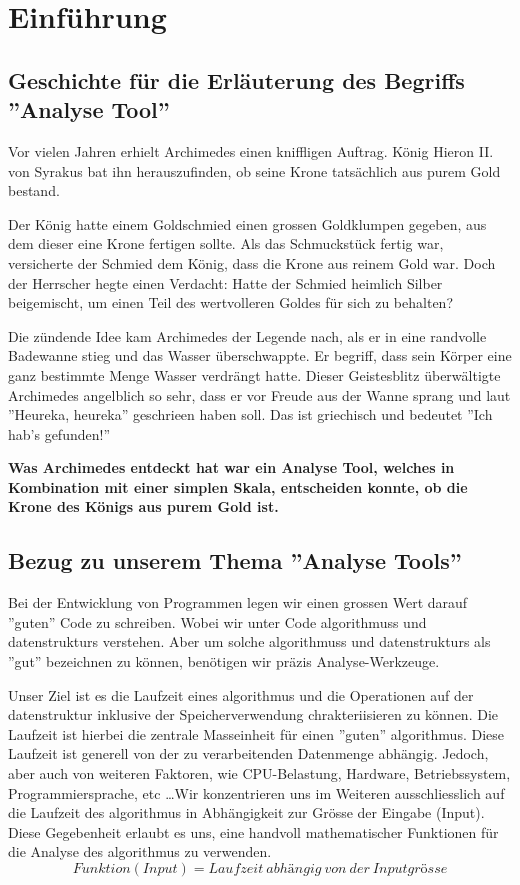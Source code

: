 \newpage
\section{Einführung}

\subsection*{Geschichte für die Erläuterung des Begriffs ''Analyse Tool''}
Vor vielen Jahren erhielt Archimedes einen kniffligen Auftrag. König Hieron II. von Syrakus bat ihn herauszufinden, ob seine Krone tatsächlich aus purem Gold bestand.

\par \medskip

Der König hatte einem Goldschmied einen grossen Goldklumpen gegeben, aus dem dieser eine Krone fertigen sollte. Als das Schmuckstück fertig war, versicherte der Schmied dem König, dass die Krone aus reinem Gold war. Doch der Herrscher hegte einen Verdacht: Hatte der Schmied heimlich Silber beigemischt, um einen Teil des wertvolleren Goldes für sich zu behalten?

\par \medskip

Die zündende Idee kam Archimedes der Legende nach, als er in eine randvolle Badewanne stieg und das Wasser überschwappte. Er begriff, dass sein Körper eine ganz bestimmte Menge Wasser verdrängt hatte. Dieser Geistesblitz überwältigte Archimedes angelblich so sehr, dass er vor Freude aus der Wanne sprang und laut ''Heureka, heureka'' geschrieen haben soll. Das ist griechisch und bedeutet ''Ich hab's gefunden!''
\par \medskip
\textbf{Was Archimedes entdeckt hat war ein Analyse Tool, welches in Kombination mit einer simplen Skala, entscheiden konnte, ob die Krone des Königs aus purem Gold ist.}

\subsection*{Bezug zu unserem Thema ''Analyse Tools''}
Bei der Entwicklung von Programmen legen wir einen grossen Wert darauf ''guten'' Code zu schreiben. Wobei wir unter Code \glspl{algorithmus} und \glspl{datenstruktur} verstehen. Aber um solche \glspl{algorithmus} und \glspl{datenstruktur} als ''gut'' bezeichnen zu können, benötigen wir prä­zis Analyse-Werkzeuge. 

\par \medskip

Unser Ziel ist es die Laufzeit eines \gls{algorithmus} und die Operationen auf der \gls{datenstruktur} inklusive der Speicherverwendung chrakteriisieren zu können. Die Laufzeit ist hierbei die zentrale Masseinheit für einen ''guten'' \gls{algorithmus}. Diese Laufzeit ist generell von der zu verarbeitenden Datenmenge abhängig. Jedoch, aber auch von weiteren Faktoren, wie CPU-Belastung, Hardware, Betriebssystem, Programmiersprache, etc \dots Wir konzentrieren uns im Weiteren ausschliesslich auf die Laufzeit des \gls{algorithmus} in Abhängigkeit zur Grösse der Eingabe (Input). Diese Gegebenheit erlaubt es uns, eine handvoll mathematischer Funktionen für die Analyse des \gls{algorithmus} zu verwenden.
$$Funktion(Input) = Laufzeit\ abhängig\ von\ der\ Inputgrösse$$
